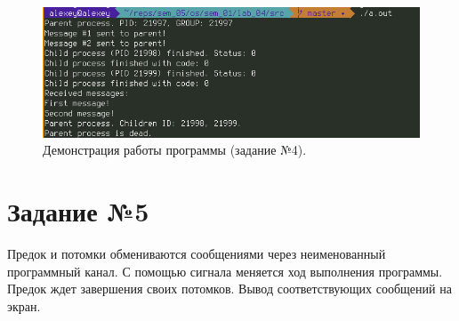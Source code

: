 \documentclass[12pt]{report}
\begin{document}
\begin{figure}[H]

	\centering

	\includegraphics[width=\linewidth]{img/task04.png}
	\caption{Демонстрация работы программы (задание №4).}

	\label{fig:task04}

\end{figure}

\section*{Задание №5}

Предок и потомки обмениваются сообщениями через неименованный программный канал. С помощью сигнала меняется ход выполнения программы. Предок ждет завершения своих потомков. Вывод соответствующих сообщений на экран.
\end{document}
